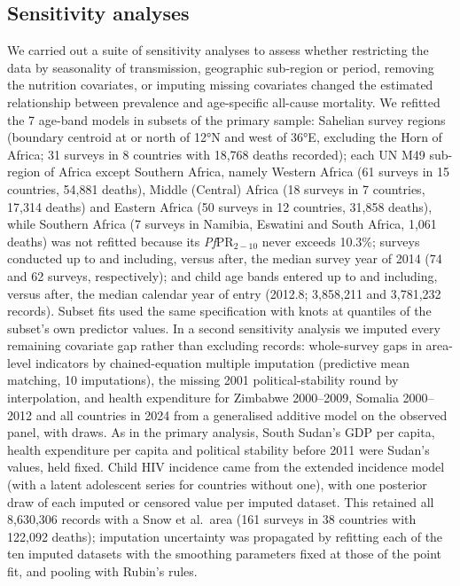 \documentclass[12pt]{article}
\begin{document}
\subsection*{Sensitivity analyses}
We carried out a suite of sensitivity analyses to assess whether restricting the data by seasonality of transmission, geographic sub-region or period, removing the nutrition covariates, or imputing missing covariates changed the estimated relationship between prevalence and age-specific all-cause mortality.
We refitted the 7 age-band models in subsets of the primary sample: Sahelian survey regions (boundary centroid at or north of 12°N and west of 36°E, excluding the Horn of Africa; 31 surveys in 8 countries with 18,768 deaths recorded); each UN M49 sub-region of Africa except Southern Africa, namely Western Africa (61 surveys in 15 countries, 54,881 deaths), Middle (Central) Africa (18 surveys in 7 countries, 17,314 deaths) and Eastern Africa (50 surveys in 12 countries, 31,858 deaths), while Southern Africa (7 surveys in Namibia, Eswatini and South Africa, 1,061 deaths) was not refitted because its \textit{Pf}PR$_{2-10}$ never exceeds 10.3\%; surveys conducted up to and including, versus after, the median survey year of 2014 (74 and 62 surveys, respectively); and child age bands entered up to and including, versus after, the median calendar year of entry (2012.8; 3,858,211 and 3,781,232 records). Subset fits used the same specification with knots at quantiles of the subset's own predictor values. In a second sensitivity analysis we imputed every remaining covariate gap rather than excluding records: whole-survey gaps in area-level indicators by chained-equation multiple imputation (predictive mean matching, 10 imputations), the missing 2001 political-stability round by interpolation, and health expenditure for Zimbabwe 2000–2009, Somalia 2000–2012 and all countries in 2024 from a generalised additive model on the observed panel, with draws. As in the primary analysis, South Sudan's GDP per capita, health expenditure per capita and political stability before 2011 were Sudan's values, held fixed. Child HIV incidence came from the extended incidence model (with a latent adolescent series for countries without one), with one posterior draw of each imputed or censored value per imputed dataset. This retained all 8,630,306 records with a Snow et al.\ area (161 surveys in 38 countries with 122,092 deaths); imputation uncertainty was propagated by refitting each of the ten imputed datasets with the smoothing parameters fixed at those of the point fit, and pooling with Rubin's rules.
\end{document}
